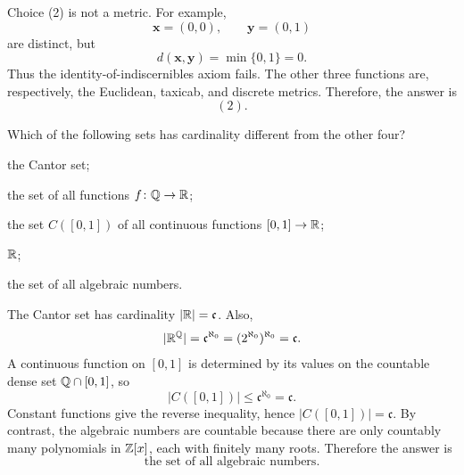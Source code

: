     \begin{solution}
        Choice (2) is not a metric. For example,
        \[
            \mathbf{x}=(0,0),
            \qquad
            \mathbf{y}=(0,1)
        \]
        are distinct, but
        \[
            d(\mathbf{x},\mathbf{y})
            =
            \min\{0,1\}
            =
            0.
        \]
        Thus the identity-of-indiscernibles axiom fails. The other three
        functions are, respectively, the Euclidean, taxicab, and discrete
        metrics. Therefore, the answer is
        \[
            \boxed{(2)}.
        \]
    \end{solution}

    \begin{expectedproblem}
        Which of the following sets has cardinality different from the other
        four?
        \begin{problemchoices}
            \item the Cantor set;
            \item the set of all functions $f\colon\mathbb{Q}\to\mathbb{R}$;
            \item the set $C([0,1])$ of all continuous functions
                  $[0,1]\to\mathbb{R}$;
            \item $\mathbb{R}$;
            \item the set of all algebraic numbers.
        \end{problemchoices}
    \end{expectedproblem}

    \begin{solution}
        The Cantor set has cardinality $|\mathbb{R}|=\mathfrak{c}$. Also,
        \[
            |\mathbb{R}^{\mathbb{Q}}|
            =
            \mathfrak{c}^{\aleph_0}
            =
            (2^{\aleph_0})^{\aleph_0}
            =
            \mathfrak{c}.
        \]
        A continuous function on $[0,1]$ is determined by its values on the
        countable dense set $\mathbb{Q}\cap[0,1]$, so
        \[
            |C([0,1])|\leq\mathfrak{c}^{\aleph_0}=\mathfrak{c}.
        \]
        Constant functions give the reverse inequality, hence
        $|C([0,1])|=\mathfrak{c}$. By contrast, the algebraic numbers are
        countable because there are only countably many polynomials in
        $\mathbb{Z}[x]$, each with finitely many roots. Therefore the answer is
        \[
            \boxed{\text{the set of all algebraic numbers}}.
        \]
    \end{solution}

